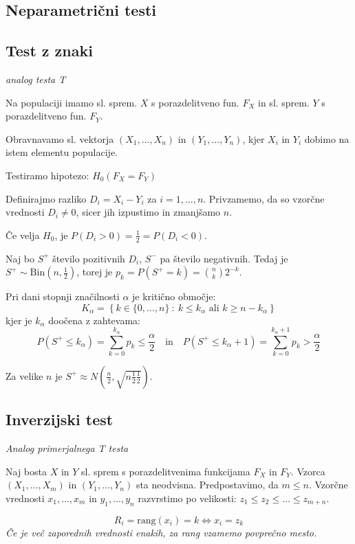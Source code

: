 \begin{multicols}{5}
\section{Neparametrični testi}
\subsection{Test z znaki}
\textit{analog testa T}

Na populaciji imamo sl. sprem. $X$ s porazdelitveno fun. $F_X$ in sl. sprem. $Y$ s porazdelitveno fun. $F_Y$.

Obravnavamo sl. vektorja $(X_1, \dots, X_n)$ in $(Y_1, \dots, Y_n)$, kjer $X_i$ in $Y_i$ dobimo na istem elementu populacije.

Testiramo hipotezo: $H_0 (F_X = F_Y)$

Definirajmo razliko $D_i = X_i - Y_i$ za $i = 1,\dots , n$. Privzamemo, da so vzorčne vrednosti $D_i \neq 0$, sicer jih izpustimo in zmanjšamo $n$.

Če velja $H_0$, je $P(D_i > 0) = \frac{1}{2} = P(D_i < 0)$.

Naj bo $S^+$ število pozitivnih $D_i$, $S^-$ pa število negativnih. Tedaj je $S^+ \sim \text{Bin}(n, \frac{1}{2})$, torej je $p_k = P(S^+ = k) = \binom{n}{k}2^{-k}$.

Pri dani stopnji značilnosti $\alpha$ je kritično območje:
\[ K_\alpha = \left\{ k \in \{0, \dots, n\} \ :\ k \leq k_\alpha \text{ ali } k \geq n - k_\alpha \right\}\]
kjer je $k_\alpha$ doočena z zahtevama:
{\small
\[P(S^+ \leq k_\alpha) = \sum_{k=0}^{k_\alpha} p_k \leq \frac{\alpha}{2} \quad \text{in} \quad P(S^+ \leq k_\alpha + 1) = \sum_{k=0}^{k_\alpha + 1} p_k > \frac{\alpha}{2} \]
}

Za velike $n$ je $S^+ \approx N(\frac{n}{2}, \sqrt{n\frac{1}{2}\frac{1}{2}})$.

\subsection{Inverzijski test}
\textit{Analog primerjalnega T testa}

Naj bosta $X$ in $Y$ sl. sprem s porazdelitvenima funkcijama $F_X$ in $F_Y$. Vzorca $(X_1, \dots, X_m)$ in $(Y_1, \dots, Y_n)$ sta neodvisna. Predpostavimo, da $m \leq n$.
Vzorčne vrednosti $x_1, \dots, x_m$ in $y_1, \dots, y_n$ razvrstimo po velikosti: $z_1 \leq z_2 \leq \dots \leq z_{m+n}$.

\[ R_i = \text{rang}(x_i) = k \iff  x_i = z_k \]
\textit{Če je več zaporednih vrednosti enakih, za rang vzamemo povprečno mesto.}


\end{multicols}
